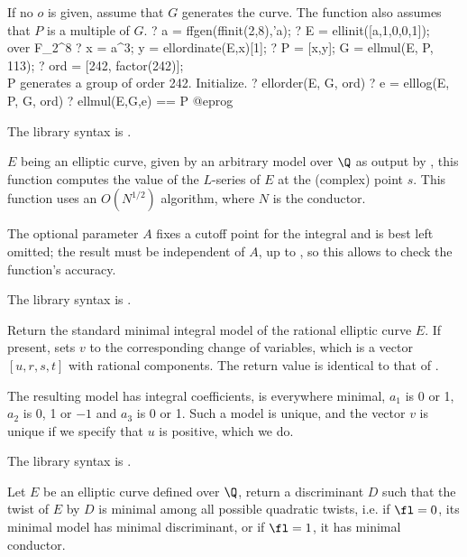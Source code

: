 If no $o$ is given, assume that $G$ generates the curve.
The function also assumes that $P$ is a multiple of $G$.
\bprog
? a = ffgen(ffinit(2,8),'a);
? E = ellinit([a,1,0,0,1]);  \\ over F_{2^8}
? x = a^3; y = ellordinate(E,x)[1];
? P = [x,y]; G = ellmul(E, P, 113);
? ord = [242, factor(242)]; \\ P generates a group of order 242. Initialize.
? ellorder(E, G, ord)
? e = elllog(E, P, G, ord)
? ellmul(E,G,e) == P
@eprog

The library syntax is .

\label{se:elllseries}
$E$ being an elliptic curve, given by an arbitrary model over $\Q$ as output
by , this function computes the value of the $L$-series of $E$ at
the (complex) point $s$. This function uses an $O(N^{1/2})$ algorithm, where
$N$ is the conductor.

The optional parameter $A$ fixes a cutoff point for the integral and is best
left omitted; the result must be independent of $A$, up to
, so this allows to check the function's accuracy.

The library syntax is .

\label{se:ellminimalmodel}
Return the standard minimal integral model of the rational elliptic
curve $E$. If present, sets $v$ to the corresponding change of variables,
which is a vector $[u,r,s,t]$ with rational components. The return value is
identical to that of .

The resulting model has integral coefficients, is everywhere minimal, $a_1$
is 0 or 1, $a_2$ is 0, 1 or $-1$ and $a_3$ is 0 or 1. Such a model is
unique, and the vector $v$ is unique if we specify that $u$ is positive,
which we do. 

The library syntax is .

\label{se:ellminimaltwist}
Let $E$ be an elliptic curve defined over $\Q$, return
a discriminant $D$ such that the twist of $E$ by $D$ is minimal among all
possible quadratic twists, i.e. if $\fl=0$, its minimal model has minimal
discriminant, or if $\fl=1$, it has minimal conductor.


